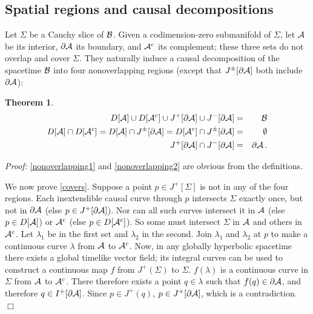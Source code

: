 \documentclass[12pt]{article}
\def\bdy{{\cal B}}
\def\regA{{\cal A}}
\def\regAc{{\cal A}^c}
\def\domd#1{D[#1]}
\newtheorem{theorem}{Theorem}
\begin{document}
\subsection{Spatial regions and causal decompositions}
\label{sec:pspatial}

Let $\Sigma$ be a Cauchy slice of $\bdy$. Given a codimension-zero submanifold of $\Sigma$, let $\regA$ be its interior, $\partial\regA$ its boundary, and $\regAc$ its complement; these three sets do not overlap and cover $\Sigma$. They naturally induce a causal decomposition of the spacetime $\bdy$ into four nonoverlapping regions (except that $J^\pm[\partial\regA]$ both include $\partial\regA$):

\begin{theorem}
\begin{eqnarray}
\domd{\regA} \cup \domd{\regAc} \cup J^+[\partial\regA]\cup J^-[\partial\regA] &=& \bdy
\label{covers}\\
D[\regA]\cap D[\regAc]=\domd{\regA} \cap J^\pm[\partial\regA] = \domd{\regAc} \cap J^\pm[\partial\regA] 
&=& \emptyset \label{nonoverlapping1}\\
J^+[\partial\regA]\cap J^-[\partial\regA]&=&\partial\regA\,.\label{nonoverlapping2}
\end{eqnarray}
\label{decomposition}\end{theorem}

\emph{Proof:} \eqref{nonoverlapping1} and \eqref{nonoverlapping2} are obvious from the definitions. 

We now prove \eqref{covers}. Suppose a point $p\in J^+[\Sigma]$ is not in any of the four regions. Each inextendible causal curve through $p$ intersects $\Sigma$ exactly once, but not in $\partial\regA$ (else $p\in J^+[\partial\regA]$). Nor can all such curves intersect it in $\regA$ (else $p\in D[\regA]$) or $\regAc$ (else $p\in D[\regAc]$). So some must intersect $\Sigma$ in $\regA$ and others in $\regAc$. Let $\lambda_1$ be in the first set and $\lambda_2$ in the second. Join $\lambda_1$ and $\lambda_2$ at $p$ to make a continuous curve $\lambda$ from $\regA$ to $\regAc$. Now, in any globally hyperbolic spacetime there exists a global timelike vector field; its integral curves can be used to construct a continuous map $f$ from $J^+(\Sigma)$ to $\Sigma$. $f(\lambda)$ is a continuous curve in $\Sigma$ from $\regA$ to $\regAc$. There therefore exists a point $q\in\lambda$ such that $f(q)\in\partial\regA$, and therefore $q\in I^+[\partial\regA]$. Since $p\in J^+(q)$, $p\in J^+[\partial\regA]$, which is a contradiction. 
$\Box$\bigskip
\end{document}
